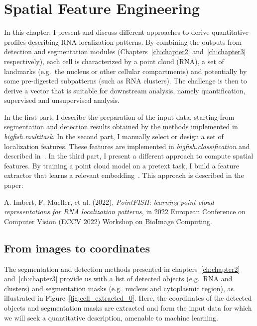 
\graphicspath{{./figures/chapter4/}}

\chapter{Spatial Feature Engineering}
\label{ch:chapter4}


\newpage
\minitoc
\newpage

In this chapter, I present and discuss different approaches to derive quantitative profiles describing \ac{RNA} localization patterns.
By combining the outputs from detection and segmentation modules (Chapters~\ref{ch:chapter2} and~\ref{ch:chapter3} respectively), each cell is characterized by a point cloud (\ac{RNA}), a set of landmarks (e.g.~the nucleus or other cellular compartments) and potentially by some pre-digested subpatterns (such as \ac{RNA} clusters).
The challenge is then to derive a vector that is suitable for downstream analysis, namely quantification, supervised and unsupervised analysis.

In the first part, I describe the preparation of the input data, starting from segmentation and detection results obtained by the methods implemented in \emph{bigfish.multitask}.
In the second part, I manually select or design a set of localization features.
These features are implemented in \emph{bigfish.classification} and described in~\cite{Imbert_fq_2022}.
In the third part, I present a different approach to compute spatial features.
By training a point cloud model on a pretext task, I build a feature extractor that learns a relevant embedding~\cite{pointfish_2022}.
This approach is described in the paper:

\begin{center}
	\color{green}
	A. Imbert, F. Mueller, et al. (2022), \textit{PointFISH: learning point cloud representations for RNA localization patterns}, in 2022 European Conference on Computer Vision (ECCV 2022) Workshop on BioImage Computing.
\end{center}

\section{From images to coordinates}
\label{sec:image_coordinates}

The segmentation and detection methods presented in chapters~\ref{ch:chapter2} and~\ref{ch:chapter3} provide us with a list of detected objects (e.g.~\ac{RNA} and clusters) and segmentation masks (e.g.~nucleus and cytoplasmic region), as illustrated in Figure~\ref{fig:cell_extracted_0}.
Here, the coordinates of the detected objects and segmentation masks are extracted and form the input data for which we will seek a quantitative description, amenable to machine learning.

